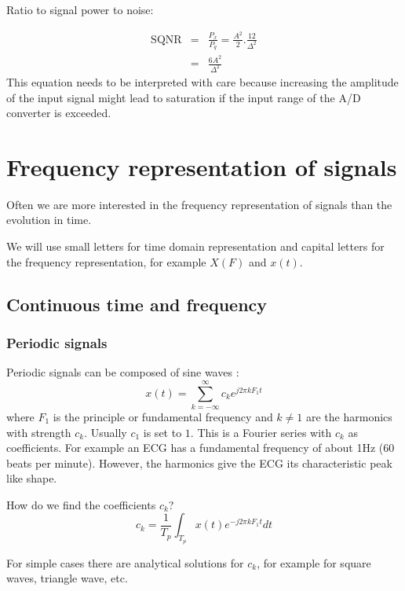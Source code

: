 \documentclass[12pt,a4paper]{article}
\begin{document}
Ratio to signal power to noise:

\begin{eqnarray}
\mbox {SQNR} &=& \frac {P_x}{P_q} = \frac{A^2}{2} . \frac{12}{\Delta^2} \\
             &=& \frac{6A^2}{\Delta^2}
\end{eqnarray}
This equation needs to be interpreted with care because increasing
the amplitude of the input signal might lead to saturation if the
input range of the A/D converter is exceeded.





\section{Frequency representation of signals}
Often we are more interested in the frequency representation
of signals than the evolution in time.

We will use small letters for time domain representation
and capital letters for the frequency representation, for example
$X(F)$ and $x(t)$.

\subsection{Continuous time and frequency}

\subsubsection{Periodic signals}
Periodic signals can be composed of sine waves :
\begin{equation} 
x(t) = \sum_{k = -\infty}^{\infty} c_{k} e^{j2\pi k F_1 t}
\end{equation}
where $F_1$ is the principle or fundamental frequency and $k \neq 1$ are the
harmonics with strength $c_k$. Usually $c_1$ is set to $1$. This is a
Fourier series with $c_{k}$ as coefficients. For example an
ECG has a fundamental frequency of about 1Hz (60 beats per minute).
However, the harmonics give the ECG its characteristic peak like shape.

How do we find the coefficients $c_k$?
\begin{equation} 
c_{k} = \frac{1}{T_p} \int_{T_p} x(t) e^{-j2 \pi k F_1 t} dt
\end{equation}

For simple cases there are analytical solutions for $c_k$, for example
for square waves, triangle wave, etc.
\end{document}
